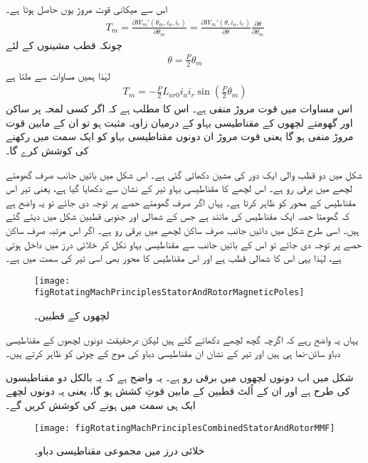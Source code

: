 اس سے میکانی قوت مروڑ  یوں حاصل ہوتا ہے۔
\begin{align}\label{مساوات_گھومتے_مشین_مروڑ_بذریعہ_توانائی}
T_m=\frac{\partial W_m'(\theta_m,i_a,i_r)}{\partial \theta_m}=\frac{\partial W_m'(\theta,i_a,i_r)}{\partial \theta} \frac{\partial \theta}{\partial \theta_m}
\end{align}
چونکہ  قطب مشینوں کے لئے
\begin{align}
\theta=\frac{P}{2} \theta_m
\end{align}
لہٰذا ہمیں مساوات   سے ملتا ہے
\begin{align}\label{مساوات_گھومتے_مشین_مروڑ_بذریعہ_کوتوانائی}
T_m=-\frac{P}{2} L_{ar0} i_a i_r \sin \left(\frac{P}{2} \theta_m\right)
\end{align}
اس مساوات میں قوت مروڑ  منفی ہے۔ اس کا مطلب ہے کہ اگر کسی لمحہ پر ساکن اور گھومتے لچھوں کے مقناطیسی بہاو کے درمیان زاویہ مثبت ہو تو ان کے مابین قوت مروڑ منفی ہو گا یعنی قوت مروڑ ان دونوں مقناطیسی بہاو کو ایک سمت میں رکھنے کی کوشش کرے گا۔

شکل   میں دو قطب والی ایک دور کی مشین دکھائی گئی ہے۔ اس شکل میں بائیں جانب صرف گھومتے لچھے میں برقی رو ہے۔ اس لچھے کا مقناطیسی بہاو تیر کے نشان سے دکھایا گیا ہے، یعنی تیر اس مقناطیس کے محور کو ظاہر کرتا ہے۔ یہاں اگر صرف گھومتے حصے پر توجہ دی جائے تو یہ واضح ہے کہ گھومتا حصہ ایک مقناطیس کی مانند ہے جس کے شمالی اور جنوبی قطبین شکل میں دیئے گئے ہیں۔ اسی طرح شکل میں دائیں جانب صرف ساکن لچھے میں برقی رو ہے۔ اگر اس مرتبہ صرف ساکن حصے پر توجہ دی جائے تو اس کے بائیں جانب سے مقناطیسی بہاو نکل کر خلائی درز میں داخل ہوتی ہے، لہٰذا یہی اس کا شمالی قطب ہے اور اس مقناطیس کا محور بھی اسی تیر کی سمت میں ہے۔
\begin{figure}
\centering
\texttt{[image: figRotatingMachPrinciplesStatorAndRotorMagneticPoles]}
\caption{لچھوں کے قطبین۔}
\label{شکل_گھومتے_مشین_لچھوں_کی_قطبین}
\end{figure}

یہاں یہ واضح رہے کہ اگرچہ گچھ لچھے دکھائے گئے ہیں  لیکن درحقیقت دونوں لچھوں کے مقناطیسی دباو سائن-نما ہی ہیں اور تیر کے نشان ان مقناطیسی دباو کی موج کے چوٹی کو ظاہر کرتے ہیں۔

شکل   میں اب دونوں لچھوں میں برقی رو ہے۔ یہ واضح ہے کہ یہ بالکل دو مقناطیسوں کی طرح ہے اور ان کے اُلٹ قطبین کے مابین قوتِ کشش ہو گا، یعنی یہ دونوں لچھے ایک ہی سمت میں ہونے کی کوشش کریں گے۔
\begin{figure}
\centering
\texttt{[image: figRotatingMachPrinciplesCombinedStatorAndRotorMMF]}
\caption{خلائی درز میں مجموعی مقناطیسی دباو۔}
\label{شکل_گھومتے_مشین_خلائی_درز_مجموعی_دباو}
\end{figure}

